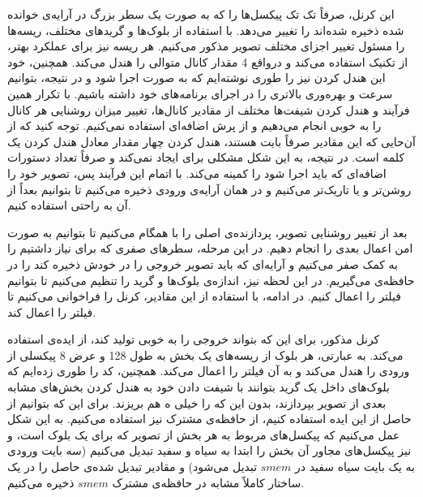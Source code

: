 \documentclass[12pt,onecolumn,a4paper]{article}
\begin{document}
این کرنل، صرفاً تک تک پیکسل‌ها را که به صورت یک سطر بزرگ در آرایه‌ی خوانده شده ذخیره شده‌اند را تغییر می‌دهد. با استفاده از بلوک‌ها و گرید‌های مختلف، ریسه‌ها را مسئول تغییر اجزای مختلف تصویر مذکور می‌کنیم. هر ریسه نیز برای عملکرد بهتر، از تکنیک  استفاده می‌کند و درواقع 4 مقدار کانال متوالی را هندل می‌کند. همچنین، خود این هندل کردن نیز را طوری نوشته‌ایم که به صورت  اجرا شود و در نتیجه، بتوانیم سرعت و بهره‌وری بالاتری را در اجرای برنامه‌های خود داشته باشیم. با تکرار همین فرآیند و هندل کردن شیفت‌ها مختلف از مقادیر کانال‌ها، تغییر میزان روشنایی هر کانال را به خوبی انجام می‌دهیم و از پرش اضافه‌ای استفاده نمی‌کنیم. توجه کنید که از آن‌حایی که این مقادیر صرفاً بایت هستند، هندل کردن چهار مقدار معادل هندل کردن یک کلمه است. در نتیجه،  به این شکل مشکلی برای  ایجاد نمی‌کند و صرفاً تعداد دستورات اضافه‌ای که باید اجرا شود را کمینه می‌کند. با اتمام این فرآیند پس، تصویر خود را روشن‌تر و یا تاریک‌تر می‌کنیم و در همان آرایه‌ی ورودی ذخیره می‌کنیم تا بتوانیم بعداً از آن به راحتی استفاده کنیم.

بعد از تغییر روشنایی تصویر، پردازنده‌ی اصلی را با  همگام می‌کنیم تا بتوانیم به صورت امن اعمال بعدی را انجام دهیم. در این مرحله، سطر‌های صفری که برای  نیاز داشتیم را به کمک  صفر می‌کنیم و آرایه‌ای که باید تصویر خروجی را در خودش ذخیره کند را در حافظه‌ی  می‌گیریم. در این لحظه نیز، اندازه‌ی بلوک‌ها و گرید را تنظیم می‌کنیم تا بتوانیم فیلتر را اعمال کنیم. در ادامه، با استفاده از این مقادیر، کرنل  را فراخوانی می‌کنیم تا فیلتر را اعمال کند.

کرنل مذکور، برای این که بتواند خروجی را به خوبی تولید کند، از ایده‌ی  استفاده می‌کند. به عبارتی، هر بلوک از ریسه‌های یک بخش به طول 128 و عرض 8 پیکسلی از ورودی را هندل می‌کند و به آن فیلتر را اعمال می‌کند. همچنین، کد را طوری زده‌ایم که بلوک‌های داخل یک گرید بتوانند با شیفت دادن خود به هندل کردن بخش‌های مشابه بعدی از تصویر بپردازند، بدون این که  را خیلی ه هم بریزند. برای این که بتوانیم از  حاصل از این ایده استفاده کنیم، از حافظه‌ی مشترک  نیز استفاده می‌کنیم. به این شکل عمل می‌کنیم که پیکسل‌های مربوط به هر بخش از تصویر که برای یک بلوک است، و نیز پیکسل‌های مجاور آن بخش را ابتدا به سیاه و سفید تبدیل می‌کنیم (سه بایت ورودی به یک بایت سیاه سفید در $smem$ تبدیل می‌شود) و مقادیر تبدیل شده‌ی حاصل را در یک ساختار کاملاً مشابه در حافظه‌ی مشترک $smem$ ذخیره می‌کنیم.
\end{document}
